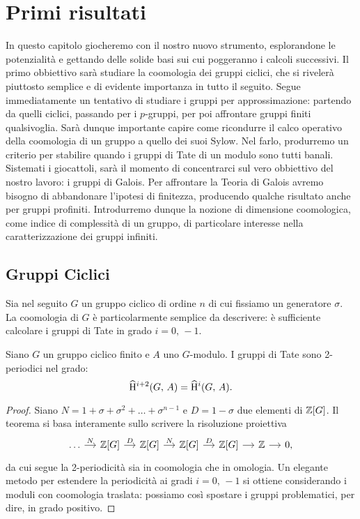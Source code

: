 \chapter{Primi risultati}
In questo capitolo giocheremo con il nostro nuovo strumento, esplorandone le potenzialità e gettando delle solide basi sui cui poggeranno i calcoli successivi. Il primo obbiettivo sarà studiare la coomologia dei gruppi ciclici, che si rivelerà piuttosto semplice e di evidente importanza in tutto il seguito. Segue immediatamente un tentativo di studiare i gruppi per approssimazione: partendo da quelli ciclici, passando per i $ p $-gruppi, per poi affrontare gruppi finiti qualsivoglia. Sarà dunque importante capire come ricondurre il calco operativo della coomologia di un gruppo a quello dei suoi Sylow. Nel farlo, produrremo un criterio per stabilire quando i gruppi di Tate di un modulo sono tutti banali. \\

Sistemati i giocattoli, sarà il momento di concentrarci sul vero obbiettivo del nostro lavoro: i gruppi di Galois. Per affrontare la Teoria di Galois avremo bisogno di abbandonare l'ipotesi di finitezza, producendo qualche risultato anche per gruppi profiniti. Introdurremo dunque la nozione di dimensione coomologica, come indice di complessità di un gruppo, di particolare interesse nella caratterizzazione dei gruppi infiniti.

\section{Gruppi Ciclici}
Sia nel seguito $ G $ un gruppo ciclico di ordine $ n $ di cui fissiamo un generatore $ \sigma $. La coomologia di $ G $ è particolarmente semplice da descrivere: è sufficiente calcolare i gruppi di Tate in grado $ i = 0, \, -1 $.

\begin{theorem}\label{ciclici}
	Siano $ G $ un gruppo ciclico finito e $ A $ uno $ G $-modulo. I gruppi di Tate sono 2-periodici nel grado:
	\[ \operatorname{\widehat{H}^{\mathnormal{i}+2}}(G, \, A) = \operatorname{\widehat{H}^\mathnormal{i}}(G, \, A). \]
\end{theorem}

\begin{proof}
	Siano $ N = 1 + \sigma + \sigma^2 + \dots + \sigma^{n-1} $ e $ D = 1 - \sigma $ due elementi di $ \mathbb{Z}[G] $. Il teorema si basa interamente sullo scrivere la risoluzione proiettiva
	\[ \begin{tikzcd}[column sep = small]
	\dots \rar["N"]
	& \Z[G] \rar["D"]
	& \Z[G] \rar["N"]
	& \Z[G] \rar["D"]
	& \Z[G] \rar
	& \Z \rar & 0,
	\end{tikzcd} \]
	da cui segue la 2-periodicità sia in coomologia che in omologia. Un elegante metodo per estendere la periodicità ai gradi $ i = 0, \, -1 $ si ottiene considerando i moduli con coomologia traslata: possiamo così spostare i gruppi problematici, per dire, in grado positivo. 
\end{proof}

